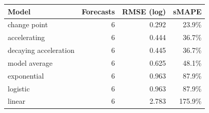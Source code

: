 \begin{tabular}{lrrr}
\toprule
Model & Forecasts & RMSE (log) & sMAPE \\
\midrule
change point & 6 & 0.292 & 23.9\% \\
accelerating & 6 & 0.444 & 36.7\% \\
decaying acceleration & 6 & 0.445 & 36.7\% \\
model average & 6 & 0.625 & 48.1\% \\
exponential & 6 & 0.963 & 87.9\% \\
logistic & 6 & 0.963 & 87.9\% \\
linear & 6 & 2.783 & 175.9\% \\
\bottomrule
\end{tabular}
